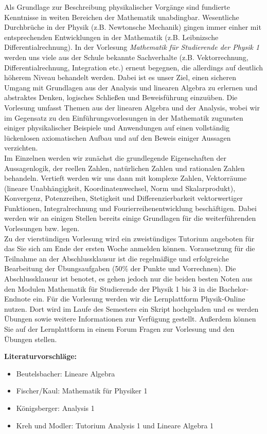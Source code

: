 Als Grundlage zur Beschreibung physikalischer Vorg\"ange sind fundierte Kenntnisse in weiten Bereichen der Mathematik unabdingbar. Wesentliche Durchbr\"uche in 
der Physik (z.B. Newtonsche Mechanik) gingen immer einher mit entsprechenden Entwicklungen in der Mathematik (z.B. Leibnizsche Differentialrechnung). In der Vorlesung 
\textsl{Mathematik f\"ur Studierende der Physik 1} werden uns viele aus der Schule bekannte Sachverhalte (z.B. Vektorrechnung, Differentialrechnung, Integration etc.) erneut begegnen,
die allerdings auf deutlich h\"oherem Niveau behandelt werden. Dabei ist es unser Ziel, einen sicheren Umgang mit Grundlagen aus der Analysis und linearen Algebra zu erlernen
 und abstraktes Denken, logisches Schlie\ss en und Beweisf\"uhrung einzu\"uben.
Die Vorlesung  umfasst Themen aus der linearen Algebra und der Analysis, wobei wir im Gegensatz zu den Einf\"uhrungsvorlesungen in der Mathematik
zugunsten einiger physikalischer Beispiele und Anwendungen auf einen vollst\"andig l\"uckenlosen axiomatischen Aufbau und auf den Beweis einiger Aussagen verzichten. \medskip\\
Im Einzelnen werden wir zun\"achst die grundlegende Eigenschaften der Aussagenlogik, der reellen Zahlen, nat\"urlichen Zahlen und rationalen Zahlen behandeln. Vertieft werden wir uns dann mit komplexe Zahlen, Vektorr\"aume (lineare Unabh\"angigkeit, Koordinatenwechsel, Norm und Skalarprodukt),
 Konvergenz, Potenzreihen, Stetigkeit und Differenzierbarkeit vektorwertiger Funktionen,
Integralrechnung und Fourierreihenentwicklung besch\"aftigen.
Dabei werden wir an einigen Stellen bereits einige Grundlagen f\"ur die weiterf\"uhrenden 
Vorlesungen  bzw.  legen. \medskip\\
Zu der vierst\"undigen Vorlesung wird ein zweist\"undiges Tutorium angeboten f\"ur das Sie sich am Ende der ersten Woche anmelden k\"onnen.
Vorausetzung f\"ur die Teilnahme an der Abschlussklausur ist die regelm\"a\ss ige und 
erfolgreiche Bearbeitung der \"Ubungsaufgaben (50\% der Punkte und Vorrechnen). Die Abschlussklausur ist benotet, es gehen jedoch nur die beiden besten 
Noten aus den Modulen Mathematik f\"ur Studierende der Physik 1 bis 3 in die Bachelor-Endnote ein. F\"ur die Vorlesung werden wir die Lernplattform
 Physik-Online nutzen. Dort wird im Laufe des Semesters ein Skript hochgeladen und es werden \"Ubungen sowie weitere Informationen zur Verf\"ugung gestellt. Au\ss erdem k\"onnen Sie auf der Lernplattform in einem Forum Fragen zur Vorlesung und den \"Ubungen stellen.
\begin{small}
\textbf{Literaturvorschl\"age:}
\begin{itemize}
\item Beutelsbacher: Lineare Algebra
\item Fischer/Kaul: Mathematik f\"ur Physiker 1
\item K\"onigsberger: Analysis 1 
\item Kreh und Modler: Tutorium Analysis 1 und Lineare Algebra 1
\end{itemize}
\end{small}

\vfill
 \vfill
